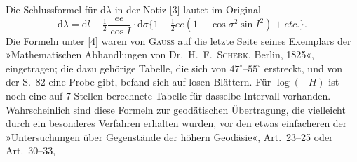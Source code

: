 {Die Schlussformel für $\mathrm d\lambda$ in der Notiz [3] lautet im Original
\[
\mathrm d\lambda=\mathrm dl-\tfrac12\frac{ee}{\cos I}\cdot\mathrm d\sigma\{1-\tfrac12ee(1-\cos\sigma^2\sin I^2)+etc.\}.
\]
Die Formeln unter [4] waren von \textsc{Gauss} auf die letzte Seite seines Exemplars der »Mathematischen Abhandlungen von Dr.\ H.\ F.\ \textsc{Scherk}, Berlin, 1825«, eingetragen; die dazu gehörige Tabelle, die sich von $47^\circ$--$55^\circ$ erstreckt, und von der S.\ 82 eine Probe gibt, befand sich auf losen Blättern. Für $\log(-H)$ ist noch eine auf 7 Stellen berechnete Tabelle für dasselbe Intervall vorhanden. Wahrscheinlich sind diese Formeln zur geodätischen Übertragung, die vielleicht durch ein besonderes Verfahren erhalten wurden, vor den etwas einfacheren der »Untersuchungen über Gegenstände der höhern Geodäsie«, Art.\ 23--25 oder Art.\ 30--33,
\par}

